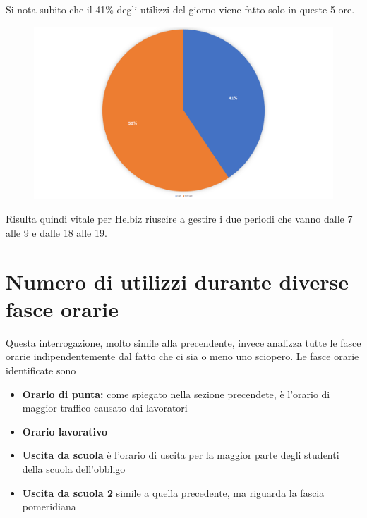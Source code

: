 Si nota subito che il 41\% degli utilizzi del giorno viene fatto solo in queste 5 ore.
\begin{figure}[H]                                                                                                                                                            
\centering                                                                                                                                                                   
\includegraphics[width=\textwidth]{images/result5}                                                                                                                                   
\label{fig:result5}                                                                                                                                                           
\end{figure}
Risulta quindi vitale per Helbiz riuscire a gestire i due periodi che vanno dalle 7 alle 9  e dalle 18 alle 19.


\section{Numero di utilizzi durante diverse fasce orarie}
Questa interrogazione, molto simile alla precendente, invece analizza
tutte le fasce orarie indipendentemente dal fatto che ci sia o meno uno sciopero.
Le fasce orarie identificate sono
\begin{itemize}
	\item{\textbf{Orario di punta:} come spiegato nella sezione precendete, è l'orario di maggior traffico causato dai lavoratori}
	\item{\textbf{Orario lavorativo}}
	\item{\textbf{Uscita da scuola} è l'orario di uscita per la maggior parte degli studenti della scuola dell'obbligo}
	\item{\textbf{Uscita da scuola 2} simile a quella precedente, ma riguarda la fascia pomeridiana}
\end{itemize}

